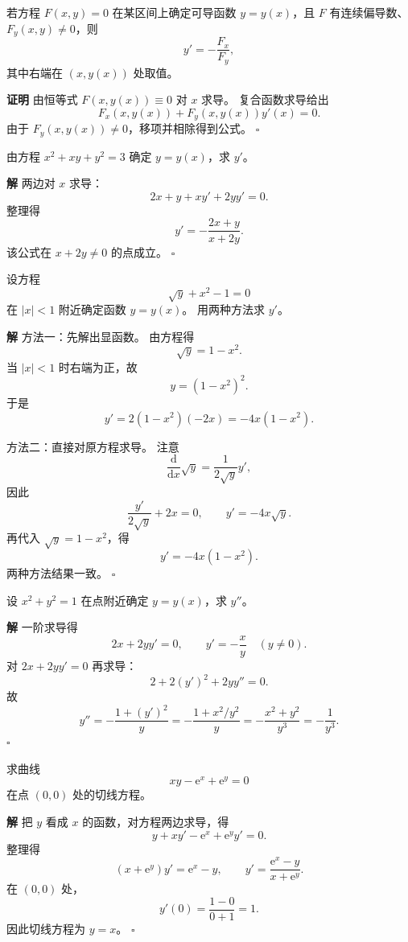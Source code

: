 \documentclass[fontset=fandol]{ctexart}
\newenvironment{proofdetail}{\par\noindent\textbf{证明}\quad}{\hfill$\square$\par\vspace{0.8em}}
\newenvironment{solution}{\par\noindent\textbf{解}\quad}{\hfill$\square$\par\vspace{0.8em}}
\newcommand{\dd}{\mathrm{d}}
\newcommand{\ee}{\mathrm{e}}
\begin{document}
\begin{proposition}[隐函数一阶求导]
若方程 $F(x,y)=0$ 在某区间上确定可导函数 $y=y(x)$，且 $F$ 有连续偏导数、$F_y(x,y)\neq0$，则
\[
y'=-\frac{F_x}{F_y},
\]
其中右端在 $(x,y(x))$ 处取值。
\end{proposition}
\begin{proofdetail}
由恒等式 $F(x,y(x))\equiv0$ 对 $x$ 求导。 复合函数求导给出
\[
F_x(x,y(x))+F_y(x,y(x))y'(x)=0.
\]
由于 $F_y(x,y(x))\neq0$，移项并相除得到公式。
\end{proofdetail}

\begin{example}[隐函数一阶导数]
由方程 $x^2+xy+y^2=3$ 确定 $y=y(x)$，求 $y'$。
\end{example}
\begin{solution}
两边对 $x$ 求导：
\[
2x+y+xy'+2yy'=0.
\]
整理得
\[
y'=-\frac{2x+y}{x+2y}.
\]
该公式在 $x+2y\neq0$ 的点成立。
\end{solution}

\begin{example}[先说明隐函数再求导]
设方程
\[
\sqrt{y}+x^2-1=0
\]
在 $|x|<1$ 附近确定函数 $y=y(x)$。 用两种方法求 $y'$。
\end{example}
\begin{solution}
方法一：先解出显函数。 由方程得
\[
\sqrt{y}=1-x^2.
\]
当 $|x|<1$ 时右端为正，故
\[
y=(1-x^2)^2.
\]
于是
\[
y'=2(1-x^2)(-2x)=-4x(1-x^2).
\]

方法二：直接对原方程求导。 注意
\[
\frac{\dd}{\dd x}\sqrt{y}
=\frac{1}{2\sqrt{y}}y',
\]
因此
\[
\frac{y'}{2\sqrt{y}}+2x=0,
\qquad
y'=-4x\sqrt{y}.
\]
再代入 $\sqrt{y}=1-x^2$，得
\[
y'=-4x(1-x^2).
\]
两种方法结果一致。
\end{solution}

\begin{example}[隐函数二阶导数]
设 $x^2+y^2=1$ 在点附近确定 $y=y(x)$，求 $y''$。
\end{example}
\begin{solution}
一阶求导得
\[
2x+2yy'=0,\qquad y'=-\frac{x}{y}\quad(y\neq0).
\]
对 $2x+2yy'=0$ 再求导：
\[
2+2(y')^2+2yy''=0.
\]
故
\[
y''=-\frac{1+(y')^2}{y}=-\frac{1+x^2/y^2}{y}
=-\frac{x^2+y^2}{y^3}=-\frac1{y^3}.
\]
\end{solution}

\begin{example}[隐函数切线]
求曲线
\[
xy-\ee^x+\ee^y=0
\]
在点 $(0,0)$ 处的切线方程。
\end{example}
\begin{solution}
把 $y$ 看成 $x$ 的函数，对方程两边求导，得
\[
y+xy'-\ee^x+\ee^y y'=0.
\]
整理得
\[
(x+\ee^y)y'=\ee^x-y,\qquad
y'=\frac{\ee^x-y}{x+\ee^y}.
\]
在 $(0,0)$ 处，
\[
y'(0)=\frac{1-0}{0+1}=1.
\]
因此切线方程为 $y=x$。
\end{solution}
\end{document}
